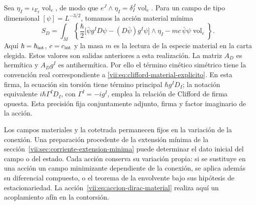 Sea \(\eta_I=\iota_{E_I}\operatorname{vol}_e\), de modo que
\(e^J\wedge\eta_I=\delta_I^J\operatorname{vol}_e\). Para un
campo de tipo dimensional \([\psi]=L^{-3/2}\), tomamos la acción
material mínima
\begin{equation}
 S_D=\int_M\left\{
 \frac{\hbar}{2}
 \bigl[\bar\psi g^I D\psi-(D\bar\psi)g^I\psi\bigr]\wedge\eta_I
 -mc\,\bar\psi\psi\operatorname{vol}_e\right\}.
 \label{vii:eq:accion-dirac-material}
\end{equation}
Aquí \(\hbar=\hbar_{\rm int}\), \(c=c_{\rm int}\) y la masa
\(m\) es la lectura de la especie material en la carta elegida.
Estos valores son salidas anteriores a esta realización. La matriz
\(A_D\) es hermítica y \(A_Dg^I\) es antihermítica. Por ello el
término cinético simétrico tiene la convención real correspondiente a
\eqref{vii:eq:clifford-material-explicito}. En esta firma, la ecuación
sin torsión tiene término principal \(\hbar g^I D_I\); la notación
equivalente \(i\hbar\Gamma^I D_I\), con \(\Gamma^I=-i g^I\),
emplea la relación de Clifford de firma opuesta. Esta precisión fija
conjuntamente adjunto, firma y factor imaginario de la acción.

Los campos materiales y la cotetrada permanecen fijos en la variación
de la conexión. Una preparación procedente de la extensión mínima de
la sección~\ref{vii:sec:corriente-extension-minima} puede determinar
el dato inicial del campo o del estado. Cada acción conserva su
variación propia: si se sustituye en una acción un campo minimizante
dependiente de la conexión, se aplica además su diferencial compuesto,
o el teorema de la envolvente bajo sus hipótesis de estacionariedad.
La acción~\eqref{vii:eq:accion-dirac-material} realiza aquí un
acoplamiento afín en la contorsión.

